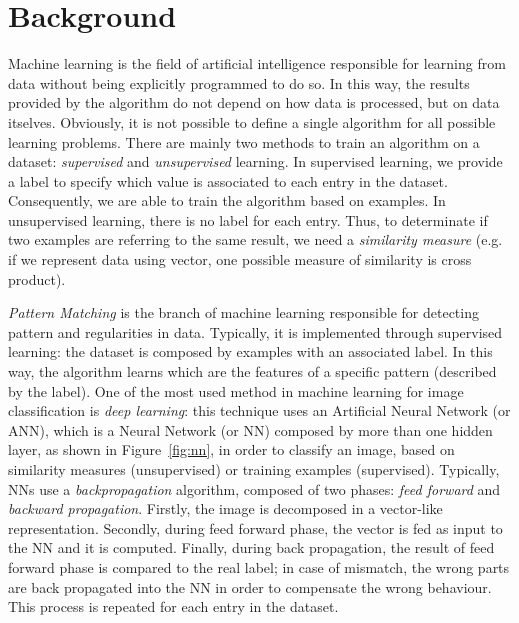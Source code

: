 \section{Background}
\label{sec:background}

Machine learning is the field of artificial intelligence responsible for learning from data without being explicitly programmed to do so. In this way, the results provided by the algorithm do not depend on how data is processed, but on data itselves. Obviously, it is not possible to define a single algorithm for all possible learning problems. There are mainly two methods to train an algorithm on a dataset: \textit{supervised} and \textit{unsupervised} learning. In supervised learning, we provide a label to specify which value is associated to each entry in the dataset. Consequently, we are able to train the algorithm based on examples. In unsupervised learning, there is no label for each entry. Thus, to determinate if two examples are referring to the same result, we need a \textit{similarity measure} (e.g. if we represent data using vector, one possible measure of similarity is cross product).

\textit{Pattern Matching} is the branch of machine learning responsible for detecting pattern and regularities in data. Typically, it is implemented through supervised learning: the dataset is composed by examples with an associated label. In this way, the algorithm learns which are the features of a specific pattern (described by the label).
One of the most used method in machine learning for image classification is \textit{deep learning}: this technique uses an Artificial Neural Network (or ANN), which is a Neural Network (or NN) composed by more than one hidden layer, as shown in Figure~\ref{fig:nn}, in order to classify an image, based on similarity measures (unsupervised) or training examples (supervised). Typically, NNs use a \textit{backpropagation} algorithm, composed of two phases: \textit{feed forward} and \textit{backward propagation}. Firstly, the image is decomposed in a vector-like representation. Secondly, during feed forward phase, the vector is fed as input to the NN and it is computed. Finally, during back propagation, the result of feed forward phase is compared to the real label; in case of mismatch, the wrong parts are back propagated into the NN in order to compensate the wrong behaviour. This process is repeated for each entry in the dataset.

